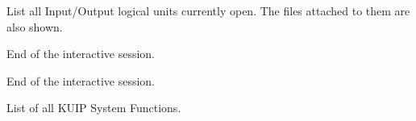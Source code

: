 \ENDCMD


   \par
List all Input/Output logical units currently open.  The files attached to 
   them are also shown.  

\ENDCMD


   \par
End of the interactive session.  

\ENDCMD


   \par
End of the interactive session.  

\ENDCMD


   \par
List of all KUIP System Functions.  

